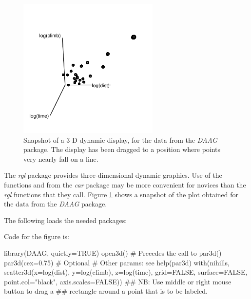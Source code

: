 \begin{figure}
\begin{Schunk}


\centerline{\includegraphics[width=0.625\textwidth]{figs/10-rgl-demo-1} }

\end{Schunk}
\caption{Snapshot of a 3-D dynamic display, for the 
data from the {\em DAAG} package.  The display has been dragged to a
position where points very nearly fall on a line.}\label{fig:rgl-ex}
\end{figure}

The \textit{rgl} package provides three-dimensional dynamic graphics.
Use of the functions  and  from
the \emph{car} package may be more convenient for novices than the
\emph{rgl} functions that they call.
Figure \ref{fig:rgl-ex} shows a snapshot of the plot obtained for the
 data from the {\em DAAG} package.

\noindent
The following loads the needed packages:
\begin{Schunk}
\end{Schunk}

Code for the figure is:
\begin{Schunk}
\begin{Sinput}
library(DAAG, quietly=TRUE)
open3d()            # Precedes the call to par3d()
par3d(cex=0.75)     # Optional
                    # Other params: see help(par3d)
with(nihills, scatter3d(x=log(dist), y=log(climb),
                        z=log(time),
                        grid=FALSE,
                        surface=FALSE,
                        point.col="black",
                        axis.scales=FALSE))
## NB: Use middle or right mouse button to drag a
## rectangle around a point that is to be labeled.
\end{Sinput}
\end{Schunk}

